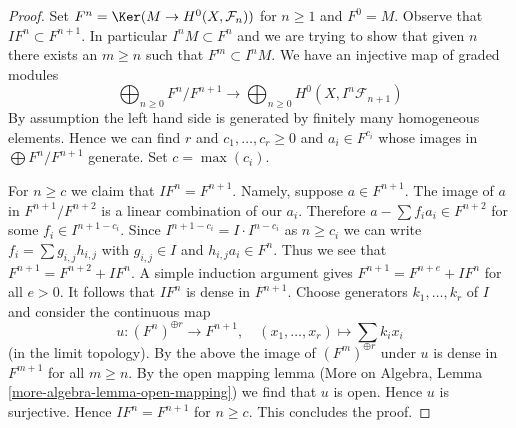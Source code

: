 \begin{proof}
Set $F^n = \Ker(M \to H^0(X, \mathcal{F}_n))$ for $n \geq 1$ and $F^0 = M$.
Observe that $I F^n \subset F^{n + 1}$. In particular $I^n M \subset F^n$
and we are trying to show that given $n$
there exists an $m \geq n$ such that $F^m \subset I^nM$.
We have an injective map of graded modules
$$
\bigoplus\nolimits_{n \geq 0} F^n/F^{n + 1}
\longrightarrow
\bigoplus\nolimits_{n \geq 0} H^0(X, I^n\mathcal{F}_{n + 1})
$$
By assumption the left hand side is generated by finitely many
homogeneous elements. Hence we can find $r$ and
$c_1, \ldots, c_r \geq 0$ and $a_i \in F^{c_i}$ whose
images in $\bigoplus F^n/F^{n + 1}$ generate.
Set $c = \max(c_i)$.

\medskip\noindent
For $n \geq c$ we claim that $I F^n = F^{n + 1}$.
Namely, suppose $a \in F^{n + 1}$. The image of
$a$ in $F^{n + 1}/F^{n + 2}$ is a linear combination
of our $a_i$. Therefore $a  - \sum f_i a_i \in F^{n + 2}$
for some $f_i \in I^{n + 1 - c_i}$. Since
$I^{n + 1 - c_i} = I \cdot I^{n - c_i}$ as $n \geq c_i$ we can write
$f_i = \sum g_{i, j} h_{i, j}$ with $g_{i, j} \in I$
and $h_{i, j}a_i \in F^n$. Thus we see that
$F^{n + 1} = F^{n + 2} + IF^n$.
A simple induction argument gives $F^{n + 1} = F^{n + e} + IF^n$
for all $e > 0$. It follows that $IF^n$ is dense in $F^{n + 1}$.
Choose generators $k_1, \ldots, k_r$ of $I$ and consider
the continuous map
$$
u : (F^n)^{\oplus r} \longrightarrow F^{n + 1},\quad
(x_1, \ldots, x_r) \mapsto \sum k_i x_i
$$
(in the limit topology).
By the above the image of $(F^m)^{\oplus r}$ under $u$ is dense in
$F^{m + 1}$ for all $m \geq n$. By the open mapping lemma
(More on Algebra, Lemma \ref{more-algebra-lemma-open-mapping}) we find
that $u$ is open. Hence $u$ is surjective. Hence $IF^n = F^{n + 1}$
for $n \geq c$. This concludes the proof.
\end{proof}

